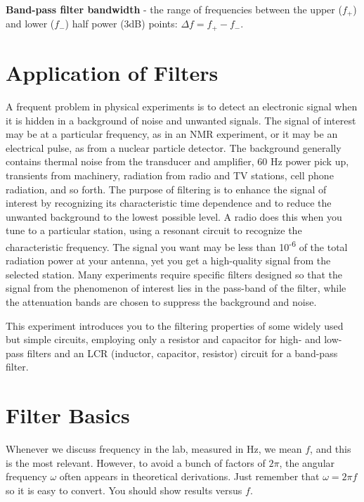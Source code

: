 \documentclass[10pt]{PhysLab1C} %
\begin{document}
\textbf{Band-pass filter bandwidth} - the range of frequencies between
the upper (\(f_+\)) and lower (\(f_-\)) half power (3dB) points:
\(\Delta f = f_+ - f_-\).


\section{Application of Filters}

A frequent problem in physical experiments is to detect an electronic
signal when it is hidden in a background of noise and unwanted signals.
The signal of interest may be at a particular frequency, as in an NMR
experiment, or it may be an electrical pulse, as from a nuclear particle
detector. The background generally contains thermal noise from the
transducer and amplifier, 60 Hz power pick up, transients from
machinery, radiation from radio and TV stations, cell phone radiation,
and so forth. The purpose of filtering is to enhance the signal of
interest by recognizing its characteristic time dependence and to reduce
the unwanted background to the lowest possible level. A radio does this
when you tune to a particular station, using a resonant circuit to
recognize the characteristic frequency. The signal you want may be less
than 10\textsuperscript{-6} of the total radiation power at your
antenna, yet you get a high-quality signal from the selected station.
Many experiments require specific filters designed so that the signal
from the phenomenon of interest lies in the pass-band of the filter,
while the attenuation bands are chosen to suppress the background and
noise.

This experiment introduces you to the filtering properties of some
widely used but simple circuits, employing only a resistor and capacitor
for high- and low-pass filters and an LCR (inductor, capacitor,
resistor) circuit for a band-pass filter.


\section{Filter Basics}

Whenever we discuss frequency in the lab, measured in Hz, we mean $f$,
and this is the most relevant. However, to avoid a bunch of factors of
$2\pi$, the angular frequency $\omega$ often appears in theoretical derivations.
Just remember that $\omega = 2\pi f$ so it is easy to convert. You should show
results versus $f$.
\end{document}
